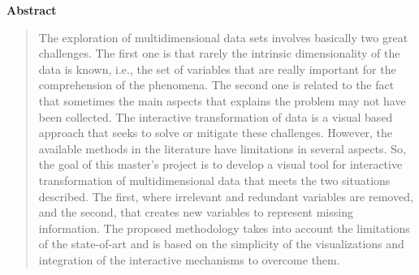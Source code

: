 \begin{center}
  \textbf{Abstract}
\end{center}

\begin{quotation}
\noindent
%
The exploration of multidimensional data sets involves
basically two great challenges. The first one is that rarely
the intrinsic dimensionality of the data is known, i.e., the
set of variables that are really important for the comprehension
of the phenomena. The second one is related to the fact that
sometimes the main aspects that explains the problem may not
have been collected. The interactive transformation of data
is a visual based approach that seeks to solve or mitigate
these challenges. However, the available methods in the
literature have limitations in several aspects. So, the goal
of this master's project is to develop a visual tool for
interactive transformation of multidimensional data that
meets the two situations described. The first, where
irrelevant and redundant variables are removed, and the
second, that creates new variables to represent missing
information. The proposed methodology takes into account the
limitations of the state-of-art and is based on the
simplicity of the visualizations and integration of the
interactive mechanisms to overcome them.
\end{quotation}
